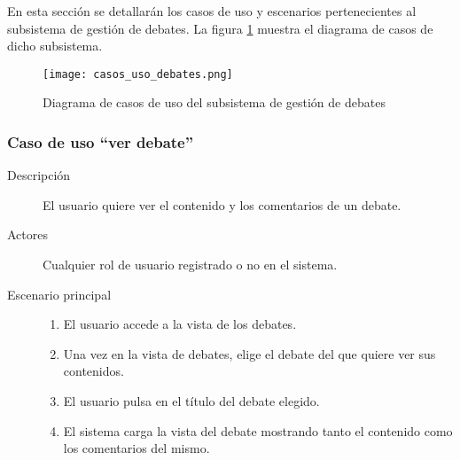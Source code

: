 En esta sección se detallarán los casos de uso y escenarios pertenecientes al subsistema de gestión de debates.
La figura \ref{fig:casos_uso_subsistema_debates} muestra el diagrama de casos de dicho subsistema.

\begin{figure}[h]
\centering
\texttt{[image: casos\_uso\_debates.png]}
\caption{Diagrama de casos de uso del subsistema de gestión de debates}
\label{fig:casos_uso_subsistema_debates}
\end{figure}


\subsubsection{Caso de uso ``ver debate''}
\begin{description}
\item[Descripción] 				El usuario quiere ver el contenido y los comentarios de un debate.
\item[Actores] 					Cualquier rol de usuario registrado o no en el sistema.
\item[Escenario principal]	 	\hfill
								\begin{enumerate}
								\item El usuario accede a la vista de los debates.
								\item Una vez en la vista de debates, elige el debate del que quiere ver sus contenidos.
								\item El usuario pulsa en el título del debate elegido.
								\item El sistema carga la vista del debate mostrando tanto el contenido como los comentarios del mismo.
								\end{enumerate}
\end{description}


